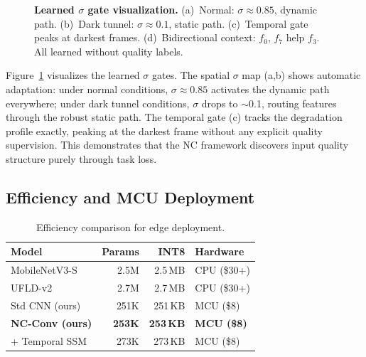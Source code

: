 \documentclass[runningheads]{llncs}
\begin{document}
\begin{figure}[t]
{%
}
\caption{\textbf{Learned $\sigma$ gate visualization.} (a)~Normal: $\sigma{\approx}0.85$, dynamic path. (b)~Dark tunnel: $\sigma{\approx}0.1$, static path. (c)~Temporal gate peaks at darkest frames. (d)~Bidirectional context: $f_0$, $f_7$ help $f_3$. All learned without quality labels.}
\label{fig:sigma_viz}
\end{figure}

Figure~\ref{fig:sigma_viz} visualizes the learned $\sigma$ gates.
The spatial $\sigma$ map (a,b) shows automatic adaptation: under normal conditions, $\sigma \approx 0.85$ activates the dynamic path everywhere; under dark tunnel conditions, $\sigma$ drops to $\sim$0.1, routing features through the robust static path.
The temporal gate (c) tracks the degradation profile exactly, peaking at the darkest frame without any explicit quality supervision.
This demonstrates that the NC framework discovers input quality structure purely through task loss.


\subsection{Efficiency and MCU Deployment}

\begin{table}[t]
\centering
\caption{Efficiency comparison for edge deployment.}
\label{tab:efficiency}
\small
\begin{tabular}{@{}lrrl@{}}
\toprule
\textbf{Model} & \textbf{Params} & \textbf{INT8} & \textbf{Hardware} \\
\midrule
MobileNetV3-S & 2.5M & 2.5\,MB & CPU (\$30+) \\
UFLD-v2 & 2.7M & 2.7\,MB & CPU (\$30+) \\
\midrule
Std CNN (ours) & 251K & 251\,KB & MCU (\$8) \\
\textbf{NC-Conv (ours)} & \textbf{253K} & \textbf{253\,KB} & \textbf{MCU (\$8)} \\
+ Temporal SSM & 273K & 273\,KB & MCU (\$8) \\
\bottomrule
\end{tabular}
\end{table}
\end{document}
